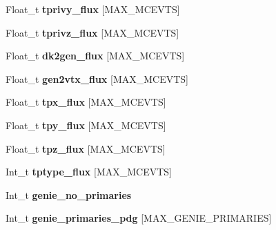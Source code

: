 \begin{DoxyCompactItemize}
\item 
\hypertarget{classanatree_aa65ed469de15f9b9bfd73fe96daa209e}{Float\-\_\-t {\bfseries tprivy\-\_\-flux} \mbox{[}M\-A\-X\-\_\-\-M\-C\-E\-V\-T\-S\mbox{]}}\label{classanatree_aa65ed469de15f9b9bfd73fe96daa209e}

\item 
\hypertarget{classanatree_ab0f4aded779c8bf3f597478a5c6f3e1a}{Float\-\_\-t {\bfseries tprivz\-\_\-flux} \mbox{[}M\-A\-X\-\_\-\-M\-C\-E\-V\-T\-S\mbox{]}}\label{classanatree_ab0f4aded779c8bf3f597478a5c6f3e1a}

\item 
\hypertarget{classanatree_a3d9b893bf93729a11d962070a700902d}{Float\-\_\-t {\bfseries dk2gen\-\_\-flux} \mbox{[}M\-A\-X\-\_\-\-M\-C\-E\-V\-T\-S\mbox{]}}\label{classanatree_a3d9b893bf93729a11d962070a700902d}

\item 
\hypertarget{classanatree_a269bdd985ff6d66b097bf6c0399181f8}{Float\-\_\-t {\bfseries gen2vtx\-\_\-flux} \mbox{[}M\-A\-X\-\_\-\-M\-C\-E\-V\-T\-S\mbox{]}}\label{classanatree_a269bdd985ff6d66b097bf6c0399181f8}

\item 
\hypertarget{classanatree_abee767b97e1f58336b63d69b188bf2bb}{Float\-\_\-t {\bfseries tpx\-\_\-flux} \mbox{[}M\-A\-X\-\_\-\-M\-C\-E\-V\-T\-S\mbox{]}}\label{classanatree_abee767b97e1f58336b63d69b188bf2bb}

\item 
\hypertarget{classanatree_a255de917c2844a31e6185c611dc7913a}{Float\-\_\-t {\bfseries tpy\-\_\-flux} \mbox{[}M\-A\-X\-\_\-\-M\-C\-E\-V\-T\-S\mbox{]}}\label{classanatree_a255de917c2844a31e6185c611dc7913a}

\item 
\hypertarget{classanatree_a0767befdb5d471ec79819c9f3aff9030}{Float\-\_\-t {\bfseries tpz\-\_\-flux} \mbox{[}M\-A\-X\-\_\-\-M\-C\-E\-V\-T\-S\mbox{]}}\label{classanatree_a0767befdb5d471ec79819c9f3aff9030}

\item 
\hypertarget{classanatree_a4129cd59ebbe7e5112966e2ddcb52e4b}{Int\-\_\-t {\bfseries tptype\-\_\-flux} \mbox{[}M\-A\-X\-\_\-\-M\-C\-E\-V\-T\-S\mbox{]}}\label{classanatree_a4129cd59ebbe7e5112966e2ddcb52e4b}

\item 
\hypertarget{classanatree_aa01aa64ca4503514365663b0071e52c3}{Int\-\_\-t {\bfseries genie\-\_\-no\-\_\-primaries}}\label{classanatree_aa01aa64ca4503514365663b0071e52c3}

\item 
\hypertarget{classanatree_ac6f98b857e5f3e95719f0583c8481009}{Int\-\_\-t {\bfseries genie\-\_\-primaries\-\_\-pdg} \mbox{[}M\-A\-X\-\_\-\-G\-E\-N\-I\-E\-\_\-\-P\-R\-I\-M\-A\-R\-I\-E\-S\mbox{]}}\label{classanatree_ac6f98b857e5f3e95719f0583c8481009}


\end{DoxyCompactItemize}
